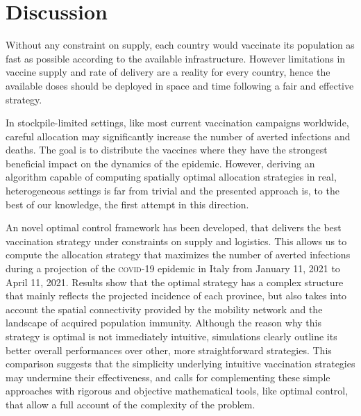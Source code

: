 \section{Discussion}
Without any constraint on supply, each country would vaccinate its population as fast as possible according to the available infrastructure. However limitations in vaccine supply and rate of delivery are a reality for every country, hence the available doses should be deployed in space and time following a fair and effective strategy. 

In stockpile-limited settings, like most current vaccination campaigns worldwide, careful allocation may significantly increase the number of averted infections and deaths. The goal is to distribute the vaccines where they have the strongest beneficial impact on the dynamics of the epidemic. However, deriving an algorithm capable of computing spatially optimal allocation strategies in real, heterogeneous settings is far from trivial and the presented approach is, to the best of our knowledge, the first attempt in this direction. 

An novel optimal control framework has been developed, that delivers the best vaccination strategy under constraints on supply and logistics. This allows us to compute the allocation strategy that maximizes the number of averted infections during a projection of the \textsc{covid}-19 epidemic in Italy from January 11, 2021 to April 11, 2021. Results show that the optimal strategy has a complex structure that mainly reflects the projected incidence of each province, but also takes into account the spatial connectivity provided by the mobility network and the landscape of acquired population immunity. Although the reason why this strategy is optimal is not immediately intuitive, simulations clearly outline its better overall performances over other, more straightforward strategies. This comparison suggests that the simplicity underlying intuitive vaccination strategies may undermine their effectiveness, and calls for complementing these simple approaches with rigorous and objective mathematical tools, like optimal control, that allow a full account of the complexity of the problem.

